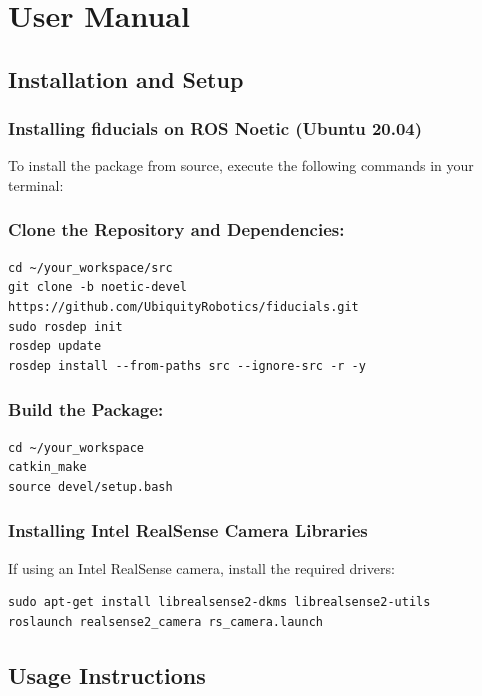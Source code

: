 \documentclass[10pt]{article}
\begin{document}
\appendix
\section{User Manual}

\subsection{Installation and Setup}

\subsubsection*{Installing fiducials on ROS Noetic (Ubuntu 20.04)}

To install the package from source, execute the following commands in your terminal:

\subsubsection*{Clone the Repository and Dependencies:}

\begin{verbatim}
cd ~/your_workspace/src
git clone -b noetic-devel https://github.com/UbiquityRobotics/fiducials.git
sudo rosdep init
rosdep update
rosdep install --from-paths src --ignore-src -r -y
\end{verbatim}

\subsubsection*{Build the Package:}

\begin{verbatim}
cd ~/your_workspace
catkin_make
source devel/setup.bash
\end{verbatim}

\subsubsection*{Installing Intel RealSense Camera Libraries}

If using an Intel RealSense camera, install the required drivers:

\begin{verbatim}
sudo apt-get install librealsense2-dkms librealsense2-utils
roslaunch realsense2_camera rs_camera.launch
\end{verbatim}

\subsection{Usage Instructions}
\end{document}
